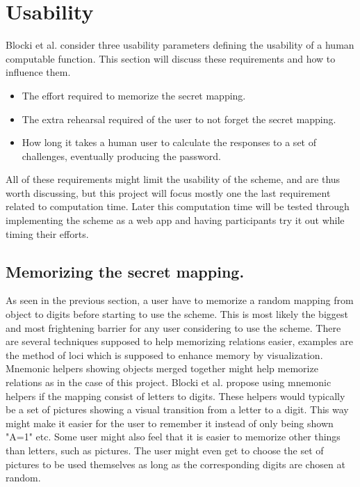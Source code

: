 \section{Usability}\label{sec:usability}
Blocki et al. \cite{hcp-blocki} consider three usability parameters defining the usability of a human computable function. This section will discuss these requirements and how to influence them. 
\begin{itemize}
    \item The effort required to memorize the secret mapping.
    \item The extra rehearsal required of the user to not forget the secret mapping. 
    \item How long it takes a human user to calculate the responses to a set of challenges, eventually producing the password. 
\end{itemize}
All of these requirements might limit the usability of the scheme, and are thus worth discussing, but this project will focus mostly one the last requirement related to computation time. Later this computation time will be tested through implementing the scheme as a web app and having participants try it out while timing their efforts.

\subsection{Memorizing the secret mapping.}
As seen in the previous section, a user have to memorize a random mapping from object to digits before starting to use the scheme. This is most likely the biggest and most frightening barrier for any user considering to use the scheme. There are several techniques supposed to help memorizing relations easier, examples are the method of loci \cite{human-memory} which is supposed to enhance memory by visualization. Mnemonic helpers showing objects merged together might help memorize relations as in the case of this project. Blocki et al. \cite{hcp-blocki} propose using mnemonic helpers if the mapping consist of letters to digits. These helpers would typically be a set of pictures showing a visual transition from a letter to a digit. This way might make it easier for the user to remember it instead of only being shown "A=1" etc. Some user might also feel that it is easier to memorize other things than letters, such as pictures. The user might even get to choose the set of pictures to be used themselves as long as the corresponding digits are chosen at random. 

